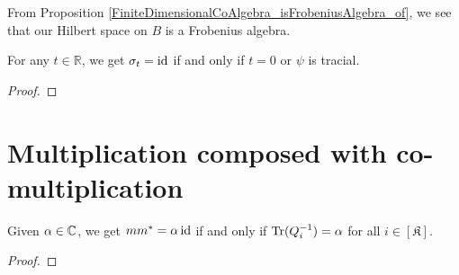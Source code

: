  From Proposition \ref{FiniteDimensionalCoAlgebra_isFrobeniusAlgebra_of}, we see that our Hilbert space on $B$ is a Frobenius algebra.
 
 \begin{proposition}\label{modAut_eq_id_iff}
  \leanok
  For any $t\in\mathbb{R}$, we get $\sigma_t=\operatorname{id}$ if and only if $t=0$ or $\psi$ is tracial.
 \end{proposition}
 \begin{proof}

 \end{proof}
 
\section{Multiplication composed with co-multiplication}

 \begin{proposition}\label{delta_form_iff}
  Given $\alpha\in\mathbb{C}$, we get $mm^*=\alpha\operatorname{id}$ if and only if $\operatorname{Tr}(Q^{-1}_i)=\alpha$ for all $i\in[\mathfrak{K}]$.
 \end{proposition}
 \begin{proof}
 \end{proof}

